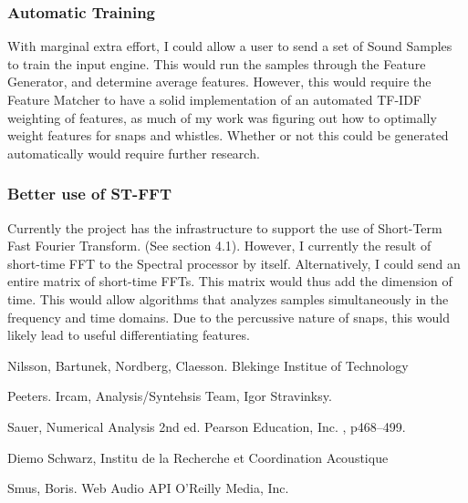 \documentclass[DIV=calc, paper=a4, fontsize=11pt, twocolumn]{scrartcl}   %
\begin{document}
   \subsubsection{Automatic Training}
   With marginal extra effort, I could allow a user to send a set of Sound Samples to train the input engine. This would run the samples through the Feature Generator, and determine average features. However, this would require the Feature Matcher to have a solid implementation of an automated TF-IDF weighting of features, as much of my work was figuring out how to optimally weight features for snaps and whistles. Whether or not this could be generated automatically would require further research.
   \subsubsection{Better use of ST-FFT}
   Currently the project has the infrastructure to support the use of Short-Term Fast Fourier Transform. (See section 4.1). However, I currently the result  of short-time FFT to the Spectral processor by itself. Alternatively, I could send an entire matrix of short-time FFTs. This matrix would thus add the dimension of time. This would allow algorithms that analyzes samples simultaneously in the frequency and time domains. Due to the percussive nature of snaps, this would likely lead to useful differentiating features.


\begin{thebibliography}{99} %


Nilsson, Bartunek, Nordberg, Claesson. Blekinge Institue of Technology

Peeters. Ircam, Analysis/Syntehsis Team, Igor Stravinksy.

Sauer, Numerical Analysis 2nd ed. Pearson Education, Inc.
, p468--499.

Diemo Schwarz, Institu de la Recherche et Coordination Acoustique

Smus, Boris. Web Audio API O'Reilly Media, Inc.


\end{thebibliography}

\end{document}
